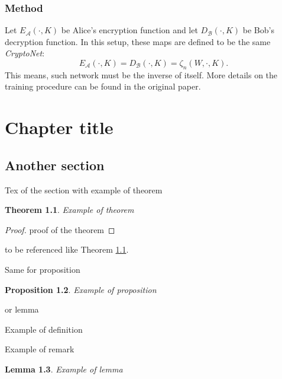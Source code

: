 \documentclass[%
    corpo=11pt,
    twoside,
    stile=classica,
    oldstyle,
    autoretitolo,
    tipotesi=magistrale,
    greek,
    evenboxes,
    english
]{toptesi}
\newtheorem{theorem}{Theorem}[section]
\newtheorem{proposition}[theorem]{Proposition}
\newtheorem{lemma}[theorem]{Lemma}
\begin{document}
\subsection{Method}
Let $E_{\mathcal{A}}(\cdot, K)$ be Alice's encryption function and let $D_{\mathcal{B}}(\cdot, K)$ be Bob's decryption function. In this setup, these maps are defined to be the same \textit{CryptoNet}:
\begin{equation}
E_{\mathcal{A}}(\cdot, K) = D_{\mathcal{B}}(\cdot, K) = \zeta_n(W, \cdot, K).
\end{equation}
This means, such network must be the inverse of itself.
More details on the training procedure can be found in the original paper.
\chapter{Chapter title}

\section{Another section}

Tex of the section with example of theorem

\begin{theorem}\label{th1}
Example of theorem
\end{theorem}
\begin{proof}
proof of the theorem
\end{proof}

to be referenced like Theorem \ref{th1}. 

Same for proposition
\begin{proposition}
Example of proposition
\end{proposition}
 or lemma
\begin{definition}
Example of definition
\end{definition}

\begin{remark}
Example of remark
\end{remark}

\begin{lemma}
Example of lemma
\end{lemma}
\end{document}

